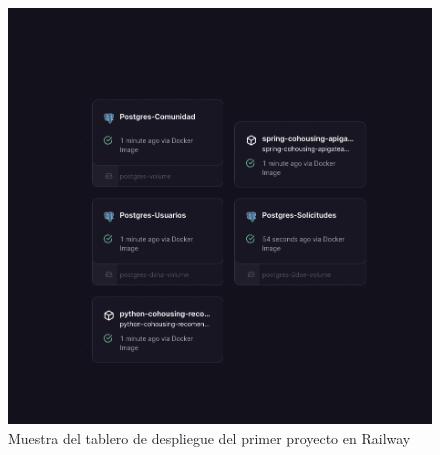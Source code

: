 \begin{figure}[H]
  \centering
  \includegraphics[width=1\textwidth]{fotos/railway1.png}
  \caption{Muestra del tablero de despliegue del primer proyecto en Railway}
  \label{fig:railway1}
\end{figure}


